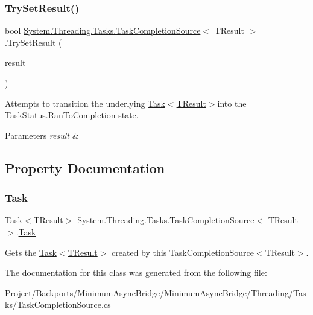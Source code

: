 \subsubsection{\texorpdfstring{Try\+Set\+Result()}{TrySetResult()}}
{\footnotesize\ttfamily bool \hyperlink{class_system_1_1_threading_1_1_tasks_1_1_task_completion_source}{System.\+Threading.\+Tasks.\+Task\+Completion\+Source}$<$ T\+Result $>$.Try\+Set\+Result (\begin{DoxyParamCaption}\item[{T\+Result}]{result }\end{DoxyParamCaption})}



Attempts to transition the underlying \hyperlink{class_system_1_1_threading_1_1_tasks_1_1_task}{Task$<$\+T\+Result$>$}into the \hyperlink{namespace_system_1_1_threading_1_1_tasks_a60ab70a6c84627853d6b1056f1edebcfaafe3c20f08a3dd6c4cab23d979c8f1e9}{Task\+Status.\+Ran\+To\+Completion} state. 


\begin{DoxyParams}{Parameters}
{\em result} & \\
\hline
\end{DoxyParams}


\subsection{Property Documentation}
\mbox{\label{class_system_1_1_threading_1_1_tasks_1_1_task_completion_source_ae2f74ab5ed620ed6590e5f92637b3510}} 
\subsubsection{\texorpdfstring{Task}{Task}}
{\footnotesize\ttfamily \hyperlink{class_system_1_1_threading_1_1_tasks_1_1_task}{Task}$<$T\+Result$>$ \hyperlink{class_system_1_1_threading_1_1_tasks_1_1_task_completion_source}{System.\+Threading.\+Tasks.\+Task\+Completion\+Source}$<$ T\+Result $>$.\hyperlink{class_system_1_1_threading_1_1_tasks_1_1_task}{Task}\hspace{0.3cm}{\ttfamily [get]}}



Gets the \hyperlink{class_system_1_1_threading_1_1_tasks_1_1_task}{Task$<$\+T\+Result$>$} created by this Task\+Completion\+Source$<$\+T\+Result$>$. 



The documentation for this class was generated from the following file\+:\begin{DoxyCompactItemize}
\item 
Project/\+Backports/\+Minimum\+Async\+Bridge/\+Minimum\+Async\+Bridge/\+Threading/\+Tasks/Task\+Completion\+Source.\+cs\end{DoxyCompactItemize}
